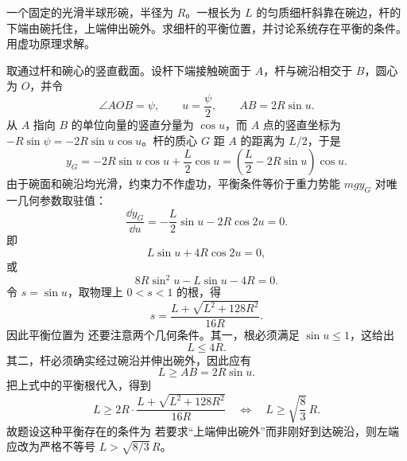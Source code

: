 
\begin{question}[半球碗中的匀质杆]
一个固定的光滑半球形碗，半径为 $R$。一根长为 $L$ 的匀质细杆斜靠在碗边，杆的下端由碗托住，上端伸出碗外。求细杆的平衡位置，并讨论系统存在平衡的条件。用虚功原理求解。

\begin{solution}
取通过杆和碗心的竖直截面。设杆下端接触碗面于 $A$，杆与碗沿相交于 $B$，圆心为 $O$，并令
\[
  \angle AOB=\psi,
  \qquad u=\frac{\psi}{2},
  \qquad AB=2R\sin u .
\]
从 $A$ 指向 $B$ 的单位向量的竖直分量为 $\cos u$，而 $A$ 点的竖直坐标为 $-R\sin\psi=-2R\sin u\cos u$。杆的质心 $G$ 距 $A$ 的距离为 $L/2$，于是
\[
  y_G=-2R\sin u\cos u+\frac L2\cos u
  =\left(\frac L2-2R\sin u\right)\cos u .
\]
由于碗面和碗沿均光滑，约束力不作虚功，平衡条件等价于重力势能 $mg y_G$ 对唯一几何参数取驻值：
\[
  \frac{\dd y_G}{\dd u}
  =-\frac L2\sin u-2R\cos 2u=0.
\]
即
\[
  L\sin u+4R\cos 2u=0,
\]
或
\[
  8R\sin^2u-L\sin u-4R=0.
\]
令 $s=\sin u$，取物理上 $0<s<1$ 的根，得
\[
  s=\frac{L+\sqrt{L^2+128R^2}}{16R}.
\]
因此平衡位置为
还要注意两个几何条件。其一，根必须满足 $\sin u\le 1$，这给出
\[
  L\le 4R.
\]
其二，杆必须确实经过碗沿并伸出碗外，因此应有
\[
  L\ge AB=2R\sin u .
\]
把上式中的平衡根代入，得到
\[
  L\ge 2R\cdot\frac{L+\sqrt{L^2+128R^2}}{16R}
  \quad\Longleftrightarrow\quad
  L\ge \sqrt{\frac83}\,R .
\]
故题设这种平衡存在的条件为
若要求“上端伸出碗外”而非刚好到达碗沿，则左端应改为严格不等号 $L>\sqrt{8/3}\,R$。
\end{solution}

\end{question}

